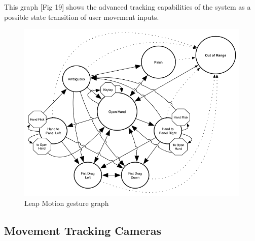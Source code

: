 \documentclass[a4paper,10pt]{article}
\begin{document}
This graph [Fig 19] shows the advanced tracking capabilities of the system as a possible state transition of user movement inputs.
 \begin{figure}[H]
\centerline{\includegraphics[scale=0.4]{leapGraph.png}}
	\caption{Leap Motion gesture graph}
	\label{fig:handGraph}
	\end{figure}
\subsection{Movement Tracking Cameras}
\end{document}
